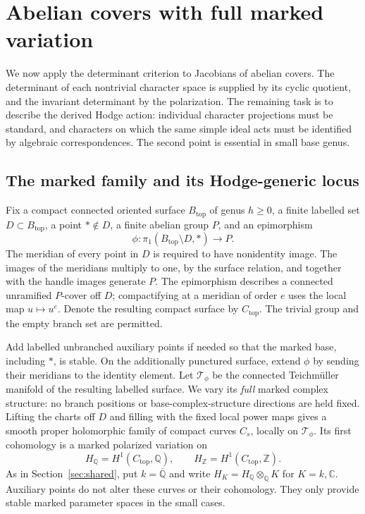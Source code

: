 \documentclass[11pt]{article}
\newcommand{\Q}{\mathbb Q}
\newcommand{\C}{\mathbb C}
\newcommand{\Qbar}{\overline{\mathbb Q}}
\theoremstyle{plain}
\theoremstyle{definition}
\theoremstyle{remark}
\numberwithin{equation}{section}
\begin{document}
\section{Abelian covers with full marked variation}
\label{p4:sec:covers}

We now apply the determinant criterion to Jacobians of abelian covers.
The determinant of each nontrivial character space is supplied by its
cyclic quotient, and the invariant determinant by the polarization.
The remaining task is to describe the derived Hodge action:
individual character projections must be standard, and characters on
which the same simple ideal acts must be identified by algebraic
correspondences.  The second point is essential in small base genus.

\subsection{The marked family and its Hodge-generic locus}

Fix a compact connected oriented surface $B_{\mathrm{top}}$ of genus
$h\ge0$, a finite labelled set $D\subset B_{\mathrm{top}}$, a point
$*\notin D$, a finite abelian group $P$, and an epimorphism
\[
 \phi:\pi_1(B_{\mathrm{top}}\setminus D,*)\longrightarrow P.
\]
The meridian of every point in $D$ is required to have nonidentity
image.  The images of the meridians multiply to one, by the surface
relation, and together with the handle images generate $P$.
The epimorphism describes a connected unramified $P$-cover off $D$;
compactifying at a meridian of order $e$ uses the local map $u\mapsto
u^e$.  Denote the resulting compact surface by $C_{\mathrm{top}}$.
The trivial group and the empty branch set are permitted.

Add labelled unbranched auxiliary points if needed so that the marked
base, including $*$, is stable.  On the additionally punctured surface,
extend $\phi$ by sending their meridians to the identity element.
Let $\mathcal T_\phi$ be the connected
Teichm\"uller manifold of the resulting labelled surface.  We vary its
\emph{full} marked complex structure: no branch positions or
base-complex-structure directions are held fixed.  Lifting the charts
off $D$ and filling with the fixed local power maps gives a smooth
proper holomorphic family of compact curves $C_s$, locally on
$\mathcal T_\phi$.  Its first cohomology is a marked polarized
variation on
\[
 H_\Q=H^1(C_{\mathrm{top}},\Q),\qquad
 H_{\mathbb Z}=H^1(C_{\mathrm{top}},\mathbb Z).
\]
As in Section~\ref{sec:shared}, put $k=\Qbar$ and write
$H_K=H_\Q\otimes_\Q K$ for $K=k,\C$.
Auxiliary points do not alter these curves or their cohomology.
They only provide stable marked parameter spaces in the small cases.
\end{document}
